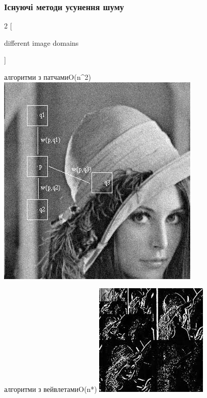 \documentclass[12pt]{beamer}
\begin{document}
\begin{frame}\frametitle{Існуючі методи усунення шуму}	
	\begin{multicols}{2}
		[
		\begin{center} different image domains \end{center}
		]
		
		алгоритми з патчами\linebreak O(n^{2}) \linebreak
		\includegraphics[scale=0.35]{images/patch}
		
		\columnbreak
		
		алгоритми з вейвлетами\linebreak O(n*) \linebreak
		\includegraphics[scale=0.65]{images/dwt}
	\end{multicols}
	
\end{frame}
\end{document}
